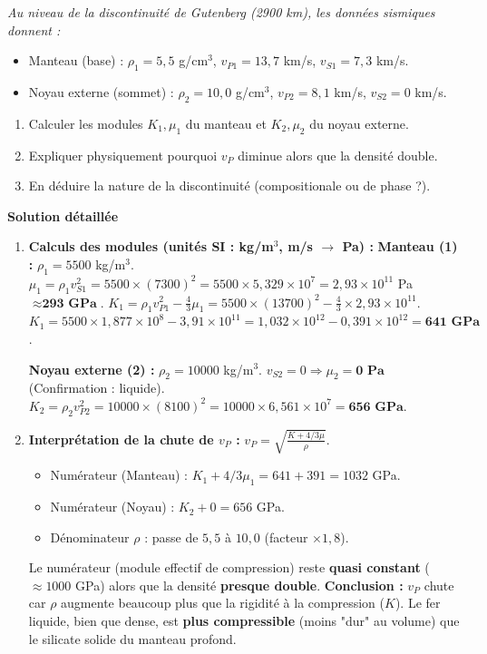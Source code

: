 \documentclass[11pt]{article}
\begin{document}
\begin{exoresolu}
\emph{Au niveau de la discontinuité de Gutenberg (2900 km), les données sismiques donnent :}
\begin{itemize}
    \item Manteau (base) : $\rho_1 = 5,5$ g/cm$^3$, $v_{P1} = 13,7$ km/s, $v_{S1} = 7,3$ km/s.
    \item Noyau externe (sommet) : $\rho_2 = 10,0$ g/cm$^3$, $v_{P2} = 8,1$ km/s, $v_{S2} = 0$ km/s.
\end{itemize}
\begin{enumerate}
    \item Calculer les modules $K_1, \mu_1$ du manteau et $K_2, \mu_2$ du noyau externe.
    \item Expliquer physiquement pourquoi $v_P$ diminue alors que la densité double.
    \item En déduire la nature de la discontinuité (compositionale ou de phase ?).
\end{enumerate}
\tcblower
\textbf{Solution détaillée}
\begin{enumerate}
    \item \textbf{Calculs des modules (unités SI : kg/m$^3$, m/s $\rightarrow$ Pa) :}
    \textbf{Manteau (1) :}
    $\rho_1 = 5500$ kg/m$^3$.
    $\mu_1 = \rho_1 v_{S1}^2 = 5500 \times (7300)^2 = 5500 \times 5,329 \times 10^7 = 2,93 \times 10^{11}$ Pa $\approx \textbf{293 GPa}$.
    $K_1 = \rho_1 v_{P1}^2 - \frac{4}{3}\mu_1 = 5500 \times (13700)^2 - \frac{4}{3} \times 2,93 \times 10^{11}$.
    $K_1 = 5500 \times 1,877 \times 10^8 - 3,91 \times 10^{11} = 1,032 \times 10^{12} - 0,391 \times 10^{12} = \textbf{641 GPa}$.
    
    \textbf{Noyau externe (2) :}
    $\rho_2 = 10000$ kg/m$^3$.
    $v_{S2} = 0 \Rightarrow \mu_2 = \textbf{0 Pa}$ (Confirmation : liquide).
    $K_2 = \rho_2 v_{P2}^2 = 10000 \times (8100)^2 = 10000 \times 6,561 \times 10^7 = \textbf{656 GPa}$.
    
    \item \textbf{Interprétation de la chute de $v_P$ :}
    $v_P = \sqrt{\frac{K + 4/3\mu}{\rho}}$.
    \begin{itemize}
        \item Numérateur (Manteau) : $K_1 + 4/3\mu_1 = 641 + 391 = 1032$ GPa.
        \item Numérateur (Noyau) : $K_2 + 0 = 656$ GPa.
        \item Dénominateur $\rho$ : passe de $5,5$ à $10,0$ (facteur $\times 1,8$).
    \end{itemize}
    Le numérateur (module effectif de compression) reste \textbf{quasi constant} ($\approx 1000$ GPa) alors que la densité \textbf{presque double}.
    \textbf{Conclusion :} $v_P$ chute car $\rho$ augmente beaucoup plus que la rigidité à la compression ($K$). Le fer liquide, bien que dense, est \textbf{plus compressible} (moins "dur" au volume) que le silicate solide du manteau profond.
    

\end{enumerate}
\end{exoresolu}
\end{document}

